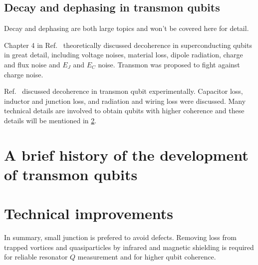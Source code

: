         

    \subsection{Decay and dephasing in transmon qubits} %
    \label{sub:decay_and_dephasing_in_transmon_qubits}

    Decay and dephasing are both large topics and won't be covered here for detail.

    Chapter 4 in Ref.~ theoretically discussed decoherence in superconducting qubits in great detail, including voltage noises, material loss, dipole radiation, charge and flux noise and $E_J$ and $E_C$ noise. Transmon was proposed to fight against charge noise.

    Ref.~ discussed decoherence in transmon qubit experimentally. Capacitor loss, inductor and junction loss, and radiation and wiring loss were discussed. Many technical details are involved to obtain qubits with higher coherence and these details will be mentioned in \ref{sec:technical_improvements}.
    
    



\section{A brief history of the development of transmon qubits} %
\label{sec:history_of_the_development_of_transmon_qubit}



\section{Technical improvements} %
\label{sec:technical_improvements}

In summary, small junction is prefered to avoid defects. Removing loss from trapped vortices and quasiparticles by infrared and magnetic shielding is required for reliable resonator $Q$ measurement and for higher qubit coherence.






